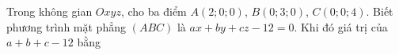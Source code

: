 \begin{ex}
Trong không gian $Oxyz$, cho ba điểm $A(2;0;0)$, $B(0;3;0)$, $C(0;0;4)$. Biết phương trình mặt phẳng $(ABC)$ là $ax+by+cz-12=0$. Khi đó giá trị của $a+b+c-12$ bằng
\end{ex}
